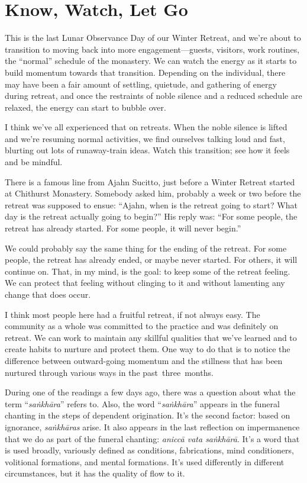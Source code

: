 
\chapter{Know, Watch, Let Go}


This is the last Lunar Observance Day of our Winter Retreat, and we're about to transition to moving back into more engagement---guests, visitors, work routines, the ``normal'' schedule of the monastery. We can watch the energy as it starts to build momentum towards that transition. Depending on the individual, there may have been a fair amount of settling, quietude, and gathering of energy during retreat, and once the restraints of noble silence and a reduced schedule are relaxed, the energy can start to bubble over.

I think we've all experienced that on retreats. When the noble silence is lifted and we're resuming normal activities, we find ourselves talking loud and fast, blurting out lots of runaway-train ideas. Watch this transition; see how it feels and be mindful.

There is a famous line from Ajahn Sucitto, just before a Winter Retreat started at Chithurst Monastery. Somebody asked him, probably a week or two before the retreat was supposed to ensue: ``Ajahn, when is the retreat going to start? What day is the retreat actually going to begin?'' His reply was: ``For some people, the retreat has already started. For some people, it will never begin.''

We could probably say the same thing for the ending of the retreat. For some people, the retreat has already ended, or maybe never started. For others, it will continue on. That, in my mind, is the goal: to keep some of the retreat feeling. We can protect that feeling without clinging to it and without lamenting any change that does occur.

I think most people here had a fruitful retreat, if not always easy. The community as a whole was committed to the practice and was definitely on retreat. We can work to maintain any skillful qualities that we've learned and to create habits to nurture and protect them. One way to do that is to notice the difference between outward-going momentum and the stillness that has been nurtured through various ways in the \mbox{past three months.}

\enlargethispage{1\baselineskip}
During one of the readings a few days ago, there was a question about what the term ``\emph{saṅkhāra}'' refers to. Also, the word ``\emph{saṅkhāra}'' appears in the funeral chanting in the steps of dependent origination. It's the second factor: based on ignorance, \emph{saṅkhāras} arise. It also appears in the last reflection on impermanence that we do as part of the funeral chanting: \emph{aniccā vata saṅkhārā}. It's a word that is used broadly, variously defined as conditions, fabrications, mind conditioners, volitional formations, and mental formations. It's used differently in different circumstances, but it has the quality of flow to it.

